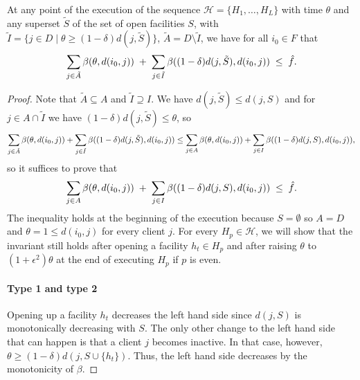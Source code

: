 \begin{lemma}
    \label{lem:overbidding-robust}
    At any point of the execution of the sequence $\mathcal{H} = \{ H_1, \dots, H_L \}$ with time $\theta$ and any superset $\tilde S$ of the set of open facilities $S$, with $\tilde I = \{j \in D \mid \theta \geq (1-\delta) d(j, \tilde S)\}$, $\tilde A = D \setminus \tilde I$, we have for all $i_0 \in F$ that 
    \[\sum_{j\in \tilde A}\beta(\theta,d(i_0,j))
\;+\;
\sum_{j\in \tilde I}\beta((1-\delta)  d(j,\tilde S), d(i_0,j))
\;\le\; \hat f.\]
\end{lemma}
\begin{proof}
Note that $\tilde A \subseteq A$ and $\tilde I \supseteq I$.
We have $d(j, \tilde S) \leq d(j,S)$ and for $j \in A \cap \tilde I$ we have $(1-\delta)d(j,\tilde S) \leq \theta$,
so
\begin{align*}
\sum_{j\in \tilde A}\beta(\theta,d(i_0,j)) + \sum_{j\in \tilde I}\beta((1-\delta)  d(j,\tilde S), d(i_0,j))
\leq \sum_{j\in A}\beta(\theta,d(i_0,j)) + \sum_{j\in I}\beta((1-\delta)  d(j,S), d(i_0,j)),
\end{align*}
so it suffices to prove that
\begin{equation}
\label{eq:invariant}
    \sum_{j\in A}\beta(\theta,d(i_0,j))
\;+\;
\sum_{j\in I}\beta((1-\delta)  d(j,S), d(i_0,j))
\;\le\; \hat f.
\end{equation}
The inequality holds at the beginning of the execution because $S = \emptyset$ so $A=D$ and $\theta = 1 \le d(i_0,j)$ for every client $j$. 
For every $H_p \in \mathcal{H}$, we will show that the invariant still holds after opening a facility $h_t \in H_p$ and after raising $\theta$ to $(1+\epsilon^2)\theta$ at the end of executing $H_p$ if $p$ is even.

\paragraph{Type 1 and type 2}
Opening up a facility $h_t$ decreases the left hand side since $d(j,S)$ is monotonically decreasing with $S$. The only other change to the left hand side that can happen is that a client $j$ becomes inactive. In that case, however, $\theta \ge (1-\delta)d(j,S\cup \{h_t\})$. Thus, the left hand side decreases by the monotonicity of $\beta$.


\end{proof}
